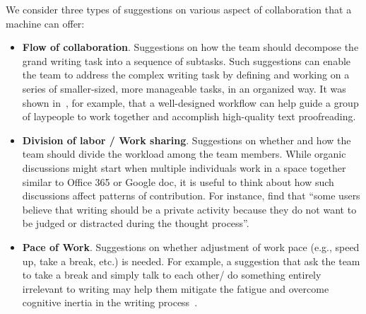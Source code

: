 We consider three types of suggestions on various aspect of collaboration that a machine can offer:


\begin{itemize}[leftmargin=*]
	\item {\bf Flow of collaboration}. Suggestions on how the team should decompose the grand writing task into a sequence of subtasks. Such suggestions can enable the team to address the complex writing task by defining and working on a series of smaller-sized, more manageable tasks, in an organized way. It was shown in~\citet{bernstein2010soylent}, for example, that a well-designed workflow can help guide a group of laypeople to work together and accomplish high-quality text proofreading. 
	\item {\bf Division of labor / Work sharing}. Suggestions on whether and how the team should divide the workload among the team members. 
    While organic discussions might start when multiple individuals work in a space together similar to Office 365 or Google doc,
    it is useful to think about how such discussions affect patterns of contribution.
    For instance, \citet{wang2017users} find that ``some users believe that writing should be a private activity because they do not want to be judged or distracted during the thought process''.
	\item {\bf Pace of Work}. Suggestions on whether adjustment of work pace (e.g., speed up, take a break, etc.) is needed. For example, a suggestion that ask the team to take a break and simply talk to each other/ do something entirely irrelevant to writing may help them mitigate the fatigue and overcome cognitive inertia in the writing process~\citep{dai2015and}.


\end{itemize}
